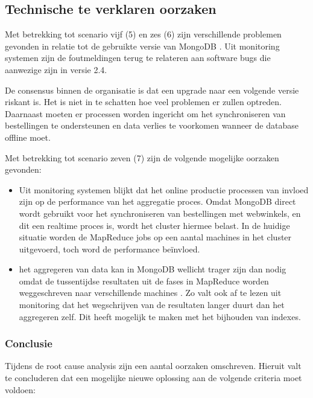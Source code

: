 \clearpage

\subsection{Technische te verklaren oorzaken}

Met betrekking tot scenario vijf (5) en zes (6) zijn verschillende problemen gevonden in relatie tot de gebruikte versie van MongoDB \parencite{mongo_changelog}. Uit monitoring systemen zijn de foutmeldingen terug te relateren aan software bugs die aanwezige zijn in versie 2.4.

De consensus binnen de organisatie is dat een upgrade naar een volgende versie riskant is. Het is niet in te schatten hoe veel problemen er zullen optreden. Daarnaast moeten er processen worden ingericht om het synchroniseren van bestellingen te ondersteunen en data verlies te voorkomen wanneer de database offline moet.
    
Met betrekking tot scenario zeven (7) zijn de volgende mogelijke oorzaken gevonden:

\begin{itemize}
    \item Uit monitoring systemen blijkt dat het online productie processen van invloed zijn op de performance van het aggregatie proces. Omdat MongoDB direct wordt gebruikt voor het synchroniseren van bestellingen met webwinkels, en dit een realtime proces is, wordt het cluster hiermee belast. In de huidige situatie worden de MapReduce jobs op een aantal machines in het cluster uitgevoerd, toch word de performance beïnvloed.
    \item het aggregeren van data kan in MongoDB wellicht trager zijn dan nodig omdat de tussentijdse resultaten uit de fases in MapReduce worden weggeschreven naar verschillende machines \parencite{mongo_mr_shards}. Zo valt ook af te lezen uit monitoring dat het wegschrijven van de resultaten langer duurt dan het aggregeren zelf. Dit heeft mogelijk te maken met het bijhouden van indexes.  \parencite{mongo_write_performance}
\end{itemize}


\subsubsection{\textbf{Conclusie}}
\label{subsec:3.3.2}

Tijdens de root cause analysis zijn een aantal oorzaken omschreven. Hieruit valt te concluderen dat een mogelijke nieuwe oplossing aan de volgende criteria moet voldoen:


